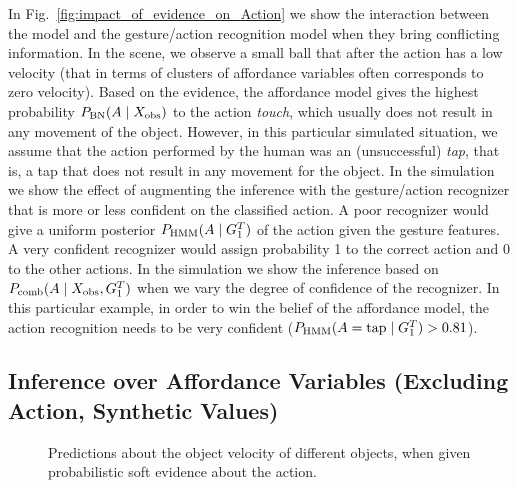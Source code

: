 In Fig.~\ref{fig:impact_of_evidence_on_Action} we show the interaction between the \AffWords{} model and the gesture/action recognition model when they bring conflicting information.
In the scene, we observe a small ball that after the action has a low velocity (that in terms of clusters of affordance variables often corresponds to zero velocity).
Based on the evidence, the affordance model gives the highest probability $P_{\text{BN}}(A \mid X_\text{obs})$ to the action \emph{touch}, which usually does not result in any movement of the object.
However, in this particular simulated situation, we assume that the action performed by the human was an (unsuccessful) \emph{tap}, that is, a tap that does not result in any movement for the object.
In the simulation we show the effect of augmenting the inference with the gesture/action recognizer that is more or less confident on the classified action.
A poor recognizer would give a uniform posterior $P_{\text{HMM}}(A \mid G_1^T)$ of the action given the gesture features.
A very confident recognizer would assign probability 1 to the correct action and 0 to the other actions.
In the simulation we show the inference based on $P_\text{comb}(A \mid X_\text{obs},G_1^T)$ when we vary the degree of confidence of the recognizer.
In this particular example, in order to win the belief of the affordance model, the action recognition needs to be very confident ($P_{\text{HMM}}(A=\text{tap} \mid G_1^T) > 0.81$).

\subsection{Inference over Affordance Variables (Excluding Action, Synthetic Values)}

\begin{figure*}
\centering
{} \quad
%
\caption{Predictions about the object velocity of different objects, when given probabilistic soft evidence about the action.}
\label{fig:impact_of_evidence_on_ObjVel}
\end{figure*}


